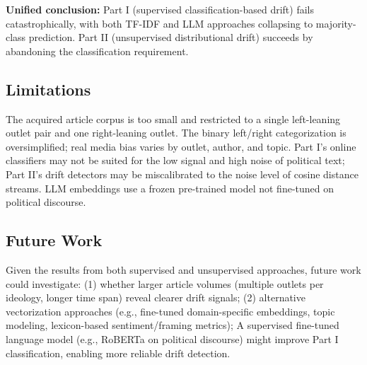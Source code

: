 \documentclass[
	a4paper,
	10pt,
	unnumberedsections,
	twoside,
]{LTJournalArticle}
\begin{document}
\textbf{Unified conclusion:} Part I (supervised classification-based drift) fails catastrophically, with both TF-IDF and LLM approaches collapsing to majority-class prediction. Part II (unsupervised distributional drift) succeeds by abandoning the classification requirement. 

\subsection{Limitations}

The acquired article corpus is too small and restricted to a single left-leaning outlet pair and one right-leaning outlet. The binary left/right categorization is oversimplified; real media bias varies by outlet, author, and topic. Part I's online classifiers may not be suited for the low signal and high noise of political text; Part II's drift detectors may be miscalibrated to the noise level of cosine distance streams. LLM embeddings use a frozen pre-trained model not fine-tuned on political discourse.

\subsection{Future Work}

Given the results from both supervised and unsupervised approaches, future work could investigate: (1) whether larger article volumes (multiple outlets per ideology, longer time span) reveal clearer drift signals; (2) alternative vectorization approaches (e.g., fine-tuned domain-specific embeddings, topic modeling, lexicon-based sentiment/framing metrics);  A supervised fine-tuned language model (e.g., RoBERTa on political discourse) might improve Part I classification, enabling more reliable drift detection. 


\printbibliography

\end{document}
